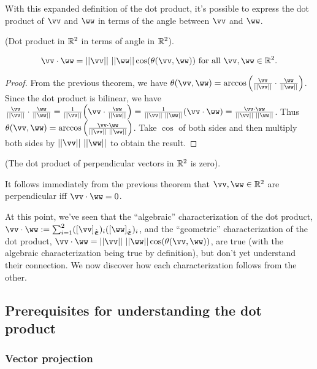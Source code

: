 With this expanded definition of the dot product, it's possible to express the dot product of $\vv$ and $\ww$ in terms of the angle between $\vv$ and $\ww$.

\begin{theorem}
    (Dot product in $\mathbb{R}^2$ in terms of angle in $\mathbb{R}^2$).

    \begin{align*}
        \vv \cdot \ww = ||\vv|| \spc ||\ww|| \cos(\theta(\vv, \ww)) \text{ for all $\vv, \ww \in \R^2$}.
    \end{align*}
\end{theorem}

\begin{proof}
    From the previous theorem, we have $\theta(\vv, \ww) = \arccos\Big( \frac{\vv}{||\vv||} \cdot \frac{\ww}{||\ww||} \Big)$. Since the dot product is bilinear, we have $\frac{\vv}{||\vv||} \cdot \frac{\ww}{||\ww||} = \frac{1}{||\vv||}\Big(\vv \cdot \frac{\ww}{||\ww||}\Big) = \frac{1}{||\vv||\spc||\ww||}(\vv \cdot \ww) = \frac{\vv \cdot \ww}{||\vv|| \spc ||\ww||}$. Thus $\theta(\vv, \ww) = \arccos\Big(\frac{\vv \cdot \ww}{||\vv|| \spc ||\ww||}\Big)$. Take $\cos$ of both sides and then multiply both sides by $||\vv|| \spc ||\ww||$ to obtain the result.
\end{proof}

\begin{remark}
    (The dot product of perpendicular vectors in $\mathbb{R}^2$ is zero).

    It follows immediately from the previous theorem that $\vv, \ww \in \R^2$ are perpendicular iff $\vv \cdot \ww = 0$.
\end{remark}

At this point, we've seen that the ``algebraic'' characterization of the dot product, $\vv \cdot \ww := \sum_{i = 1}^2 ([\vv]_\sE)_i ([\ww]_\sE)_i$, and the ``geometric'' characterization of the dot product, $\vv \cdot \ww = ||\vv|| \spc ||\ww|| \cos(\theta(\vv, \ww))$, are true (with the algebraic characterization being true by definition), but don't yet understand their connection. We now discover how each characterization follows from the other.

\newpage

\subsection*{Prerequisites for understanding the dot product}

\subsubsection*{Vector projection}

